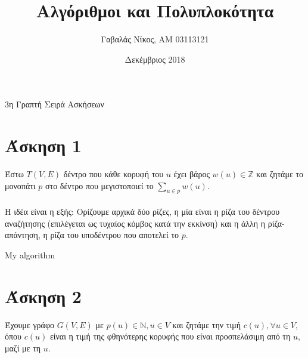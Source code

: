 \documentclass[12pt,a4paper]{article}
\title{Αλγόριθμοι και Πολυπλοκότητα}
\author{Γαβαλάς Νίκος, AM 03113121}
\date{Δεκέμβριος 2018}
\makeatletter
\def\BState{\State\hskip-\ALG@thistlm}
\makeatother
\begin{document}
  \maketitle

  \begin{center}
    \Large{3η Γραπτή Σειρά Ασκήσεων}
  \end{center}

  \section{Άσκηση 1}

  Έστω \(T(V, E)\) δέντρο που κάθε κορυφή του \(u\) έχει βάρος \(w(u) \in 
  \mathbb{Z}\) και ζητάμε το μονοπάτι \(p\) στο δέντρο που μεγιστοποιεί το
  \(\sum_{u \in p}{w(u)}\).
  \\
  \\
  Η ιδέα είναι η εξής: Ορίζουμε αρχικά δύο ρίζες, η μία είναι η ρίζα του δέντρου
  αναζήτησης (επιλέγεται ως τυχαίος κόμβος κατά την εκκίνση) και η άλλη η 
  ρίζα-απάντηση, η ρίζα του υποδέντρου που αποτελεί το \(p\).

  {\latintext
  \begin{algorithm}
    \caption{My algorithm}\label{euclid}
  \end{algorithm}
  }

  \section{Άσκηση 2}

  Έχουμε γράφο \( G(V, E) \) με \( p(u) \in \mathbb{N}, u \in V \) και ζητάμε 
  την τιμή  \( c(u), \forall u \in V \), όπου \( c(u) \) είναι η τιμή της 
  φθηνότερης κορυφής που είναι προσπελάσιμη από τη \( u \), μαζί με τη \( u \).
\end{document}

